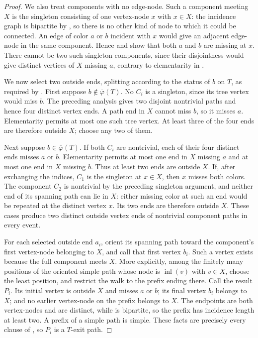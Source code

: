 \begin{proof}
We also treat components with no edge-node.  Such a component meeting
$X$ is the singleton consisting of one vertex-node $x$ with $x\in X$:
the incidence graph is bipartite by , so
there is no other kind of node to which it could be connected.  An edge
of color $a$ or $b$ incident with $x$ would give an adjacent edge-node in
the same component.  Hence  and
 show that both $a$ and $b$ are missing at $x$.
There cannot be two such singleton components, since their disjointness
would give distinct vertices of $X$ missing $a$, contrary to elementarity
in .

We now select two outside ends, splitting according to the status of $b$
on $T$, as required by .  First suppose
$b\notin\overline\varphi(T)$.  No $C_i$ is a singleton, since its tree
vertex would miss $b$.  The preceding analysis gives two disjoint
nontrivial paths and hence four distinct vertex ends.  A path end in $X$
cannot miss $b$, so it misses $a$.  Elementarity permits at most one such
tree vertex.  At least three of the four ends are therefore outside $X$;
choose any two of them.

Next suppose $b\in\overline\varphi(T)$.  If both $C_i$ are nontrivial,
each of their four distinct ends misses $a$ or $b$.  Elementarity permits
at most one end in $X$ missing $a$ and at most one end in $X$ missing
$b$.  Thus at least two ends are outside $X$.  If, after exchanging the
indices, $C_1$ is the singleton at $x\in X$, then $x$ misses both colors.
The component $C_2$ is nontrivial by the preceding singleton argument,
and neither end of its spanning path can lie in $X$: either missing color
at such an end would be repeated at the distinct vertex $x$.  Its two
ends are therefore outside $X$.  These cases produce two distinct
outside vertex ends of nontrivial component paths in every event.

For each selected outside end $a_i$, orient its spanning path toward the
component's first vertex-node belonging to $X$, and call that first vertex
$b_i$.  Such a vertex exists because the full component meets $X$.  More
explicitly, among the finitely many positions of the oriented simple path
whose node is $\operatorname{inl}(v)$ with $v\in X$, choose the least
position, and restrict the walk to the prefix ending there.  Call the
result $P_i$.  Its initial vertex is outside $X$ and misses $a$ or $b$;
its final vertex $b_i$ belongs to $X$; and no earlier vertex-node on the
prefix belongs to $X$.  The endpoints are both vertex-nodes and are
distinct, while  is bipartite, so the
prefix has incidence length at least two.  A prefix of a simple path is
simple.  These facts are precisely every clause of
, so $P_i$ is a $T$-exit path.


\end{proof}
